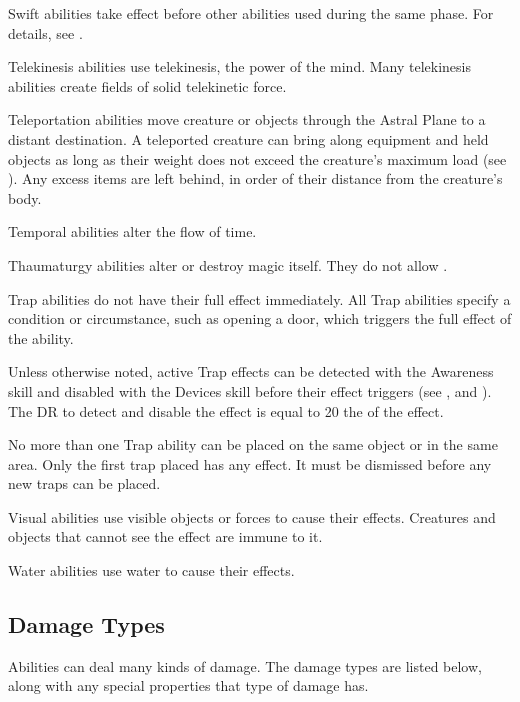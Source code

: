      Swift abilities take effect before other abilities used during the same phase.
    For details, see .

     Telekinesis abilities use telekinesis, the power of the mind.
    Many telekinesis abilities create fields of solid telekinetic force.

     Teleportation abilities move creature or objects through the Astral Plane to a distant destination.
    A teleported creature can bring along equipment and held objects as long as their weight does not exceed the creature's maximum load (see ). Any excess items are left behind, in order of their distance from the creature's body.

     Temporal abilities alter the flow of time.

     Thaumaturgy abilities alter or destroy magic itself.
    They do not allow .

     Trap abilities do not have their full effect immediately.
    All Trap abilities specify a condition or circumstance, such as opening a door, which triggers the full effect of the ability.
    \par Unless otherwise noted, active Trap effects can be detected with the Awareness skill and disabled with the Devices skill before their effect triggers (see , and ).
    The DR to detect and disable the effect is equal to 20 \add the  of the effect.
    \par No more than one Trap ability can be placed on the same object or in the same area.
    Only the first trap placed has any effect.
    It must be dismissed before any new traps can be placed.

     Visual abilities use visible objects or forces to cause their effects.
    Creatures and objects that cannot see the effect are immune to it.

     Water abilities use water to cause their effects.

    \subsection{Damage Types}\label{Damage Types}
        Abilities can deal many kinds of damage.
        The damage types are listed below, along with any special properties that type of damage has.

